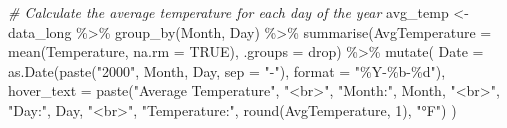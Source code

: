 \documentclass[
]{book}
\newenvironment{Shaded}{\begin{snugshade}}{\end{snugshade}}
\newcommand{\AttributeTok}[1]{\textcolor[rgb]{0.77,0.63,0.00}{#1}}
\newcommand{\CommentTok}[1]{\textcolor[rgb]{0.56,0.35,0.01}{\textit{#1}}}
\newcommand{\ConstantTok}[1]{\textcolor[rgb]{0.00,0.00,0.00}{#1}}
\newcommand{\DecValTok}[1]{\textcolor[rgb]{0.00,0.00,0.81}{#1}}
\newcommand{\FunctionTok}[1]{\textcolor[rgb]{0.00,0.00,0.00}{#1}}
\newcommand{\NormalTok}[1]{#1}
\newcommand{\OtherTok}[1]{\textcolor[rgb]{0.56,0.35,0.01}{#1}}
\newcommand{\SpecialCharTok}[1]{\textcolor[rgb]{0.00,0.00,0.00}{#1}}
\newcommand{\StringTok}[1]{\textcolor[rgb]{0.31,0.60,0.02}{#1}}
\theoremstyle{definition}
\theoremstyle{definition}
\theoremstyle{definition}
\theoremstyle{definition}
\theoremstyle{remark}
\begin{document}
\begin{Shaded}
\begin{Highlighting}[]
\CommentTok{\# Calculate the average temperature for each day of the year}
\NormalTok{avg\_temp }\OtherTok{\textless{}{-}}\NormalTok{ data\_long }\SpecialCharTok{\%\textgreater{}\%}
  \FunctionTok{group\_by}\NormalTok{(Month, Day) }\SpecialCharTok{\%\textgreater{}\%}
  \FunctionTok{summarise}\NormalTok{(}\AttributeTok{AvgTemperature =} \FunctionTok{mean}\NormalTok{(Temperature, }\AttributeTok{na.rm =} \ConstantTok{TRUE}\NormalTok{), }\AttributeTok{.groups =} \StringTok{\textquotesingle{}drop\textquotesingle{}}\NormalTok{) }\SpecialCharTok{\%\textgreater{}\%}
  \FunctionTok{mutate}\NormalTok{(}
    \AttributeTok{Date =} \FunctionTok{as.Date}\NormalTok{(}\FunctionTok{paste}\NormalTok{(}\StringTok{"2000"}\NormalTok{, Month, Day, }\AttributeTok{sep =} \StringTok{"{-}"}\NormalTok{), }\AttributeTok{format =} \StringTok{"\%Y{-}\%b{-}\%d"}\NormalTok{),}
    \AttributeTok{hover\_text =} \FunctionTok{paste}\NormalTok{(}\StringTok{"Average Temperature"}\NormalTok{, }\StringTok{"\textless{}br\textgreater{}"}\NormalTok{,}
                       \StringTok{"Month:"}\NormalTok{, Month, }\StringTok{"\textless{}br\textgreater{}"}\NormalTok{,}
                       \StringTok{"Day:"}\NormalTok{, Day, }\StringTok{"\textless{}br\textgreater{}"}\NormalTok{,}
                       \StringTok{"Temperature:"}\NormalTok{, }\FunctionTok{round}\NormalTok{(AvgTemperature, }\DecValTok{1}\NormalTok{), }\StringTok{"°F"}\NormalTok{)}
\NormalTok{  )}


\end{Highlighting}
\end{Shaded}
\end{document}
